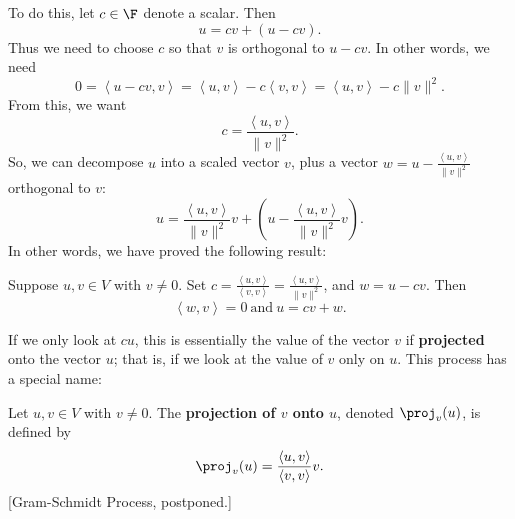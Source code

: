 \documentclass[math0540-lecture-notes.tex]{subfiles}
\begin{document}
To do this, let $c\in \F$ denote a scalar. Then \[
  u = cv+(u-cv)
.\] Thus we need to choose $c$ so that $v$ is orthogonal to $u-cv$. In other words, we need \[
  0 =\left<u-cv,v \right> =\left<u,v \right> - c\left<v,v \right> =\left<u,v \right>-c\|v\|^2
.\] From this, we want \[
  c = \frac{\left<u,v \right>}{\|v\|^2}
.\] So, we can decompose $u$ into a scaled vector $v$, plus a vector $w=u-\frac{\left<u,v
\right>}{\|v\|^2}$ orthogonal to $v$: \[
  u = \frac{\left<u,v \right>}{\|v\|^2}v+\left(u-\frac{\left<u,v \right>}{\|v\|^2}v\right)
.\] In other words, we have proved the following result:
\begin{proposition}{}
  Suppose $u,v\in V$ with $v\neq 0$. Set $c=\frac{\left<u,v \right>}{\left<v,v
  \right>}=\frac{\left<u,v \right>}{\|v\|^2}$, and $w=u-cv$. Then \[
    \left<w,v \right>=0 ~\text{and}~u=cv+w
  .\] 
\end{proposition}

If we only look at $cu$, this is essentially the value of the vector $v$ if \textbf{projected} onto
the vector $u$; that is, if we look at the value of $v$ only on $u$. This process has a special
name:
\begin{definition}{}
  Let $u,v\in V$ with $v\neq 0$. The \textbf{projection of $v$ onto $u$}, denoted $\proj_{v}(u)$, is
  defined by \[
    \proj_{v}(u)=\frac{\left<u,v \right>}{\left<v,v \right>}v
  .\] [Gram-Schmidt Process, postponed.]
\end{definition}
\end{document}
